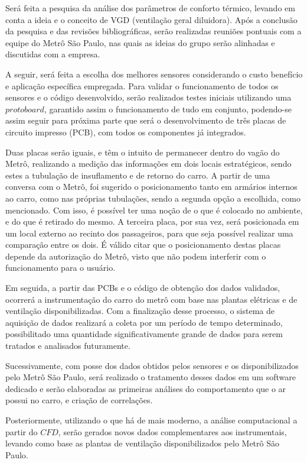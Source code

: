 \documentclass[acronym,symbols]{fei}
\begin{document}
Será feita a pesquisa da análise dos parâmetros de conforto térmico, levando em conta a ideia e o conceito de VGD (ventilação geral diluidora). Após a conclusão da pesquisa e das revisões bibliográficas, serão realizadas reuniões pontuais com a equipe do Metrô São Paulo, nas quais as ideias do grupo serão alinhadas e discutidas com a empresa. 

A seguir, será feita a escolha dos melhores sensores considerando o custo benefício e aplicação específica empregada. Para validar o funcionamento de todos os sensores e o código desenvolvido, serão realizados testes iniciais utilizando uma $protoboard$, garantido assim o funcionamento de tudo em conjunto, podendo-se assim seguir para próxima parte que será o desenvolvimento de três placas de circuito impresso (PCB), com todos os componentes já integrados. 

Duas placas serão iguais, e têm o intuito de permanecer dentro do vagão do Metrô, realizando a medição das informações em dois locais estratégicos, sendo estes a tubulação de insuflamento e de retorno do carro. A partir de uma conversa com o Metrô, foi sugerido o posicionamento tanto em armários internos ao carro, como nas próprias tubulações, sendo a segunda opção a escolhida, como mencionado. Com isso, é possível ter uma noção de o que é colocado no ambiente, e do que é retirado do mesmo. A terceira placa, por sua vez, será posicionada em um local externo ao recinto dos passageiros, para que seja possível realizar uma comparação entre os dois. É válido citar que o posicionamento destas placas depende da autorização do Metrô, visto que não podem interferir com o funcionamento para o usuário.
 

Em seguida, a partir das PCBs e o código de obtenção dos dados validados, ocorrerá a instrumentação do carro do metrô com base nas plantas elétricas e de ventilação disponibilizadas. Com a finalização desse processo, o sistema de aquisição de dados realizará a coleta por um período de tempo determinado, possibilitado uma quantidade significativamente grande de dados para serem tratados e analisados futuramente.

Sucessivamente, com posse dos dados obtidos pelos sensores e os disponibilizados pelo Metrô São Paulo, será realizado o tratamento desses dados em um software dedicado e serão elaboradas as primeiras análises do comportamento que o ar possui no carro, e criação de correlações.

Posteriormente, utilizando o que há de mais moderno, a análise computacional a partir do $CFD$, serão gerados novos dados complementares aos instrumentais, levando como base as plantas de ventilação disponibilizados pelo Metrô São Paulo.
\end{document}
